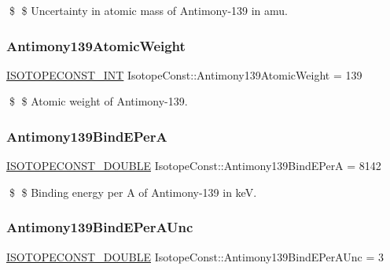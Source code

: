 \$ \$ Uncertainty in atomic mass of Antimony-\/139 in amu. \mbox{\label{group___isotope_const-_antimony-_sb139_gaa67023b4d20280556caaff5c57d2aa7b}} 
\subsubsection{\texorpdfstring{Antimony139\+Atomic\+Weight}{Antimony139AtomicWeight}}
{\footnotesize\ttfamily \mbox{\hyperlink{group___isotope_const-_macros_ga5f18360b3e99483a35c32d789e62621c}{I\+S\+O\+T\+O\+P\+E\+C\+O\+N\+S\+T\+\_\+\+I\+NT}} Isotope\+Const\+::\+Antimony139\+Atomic\+Weight = 139}

\$ \$ Atomic weight of Antimony-\/139. \mbox{\label{group___isotope_const-_antimony-_sb139_ga38c838d33ee0fa7eb6372e61491327b6}} 
\subsubsection{\texorpdfstring{Antimony139\+Bind\+E\+PerA}{Antimony139BindEPerA}}
{\footnotesize\ttfamily \mbox{\hyperlink{group___isotope_const-_macros_ga8f45a7272ce02c0b4c65c44636ed719a}{I\+S\+O\+T\+O\+P\+E\+C\+O\+N\+S\+T\+\_\+\+D\+O\+U\+B\+LE}} Isotope\+Const\+::\+Antimony139\+Bind\+E\+PerA = 8142}

\$ \$ Binding energy per A of Antimony-\/139 in keV. \mbox{\label{group___isotope_const-_antimony-_sb139_ga816e82a6d14dd51cb627740127117949}} 
\subsubsection{\texorpdfstring{Antimony139\+Bind\+E\+Per\+A\+Unc}{Antimony139BindEPerAUnc}}
{\footnotesize\ttfamily \mbox{\hyperlink{group___isotope_const-_macros_ga8f45a7272ce02c0b4c65c44636ed719a}{I\+S\+O\+T\+O\+P\+E\+C\+O\+N\+S\+T\+\_\+\+D\+O\+U\+B\+LE}} Isotope\+Const\+::\+Antimony139\+Bind\+E\+Per\+A\+Unc = 3}

